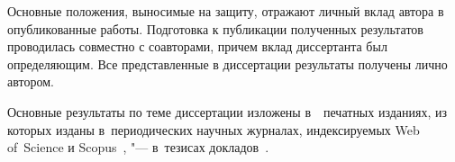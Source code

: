 \vspace{0.25cm}
{\contribution} Основные положения, выносимые на защиту, отражают личный вклад автора в опубликованные работы.
Подготовка к публикации полученных результатов проводилась совместно с соавторами, причем вклад диссертанта был определяющим.
Все представленные в диссертации результаты получены лично автором.

\vspace{0.25cm}
{\publications} Основные результаты по теме диссертации изложены в~~печатных изданиях,  из которых изданы в~периодических научных журналах, индексируемых Web of~Science и Scopus~\autocite{artemenko2016formation, samsonov2018asymptotic, samsonov2019laser, samsonov2020superluminal, samsonov2021hydrodynamical, samsonov2021effect, samsonov2021beamstrahlung, filipovic2021effect, samsonov2022simulation, samsonov2022high},  "--- в~тезисах докладов~\cite{samsonov2018NW, samsonov2019FNP, samsonov2020NW, samsonov2020UFL, samsonov2020Math, samsonov2021EPS, samsonov2021UFL, samsonov2021LPHYS, samsonov2022CSCPIER, samsonov2022LPHYS}.


